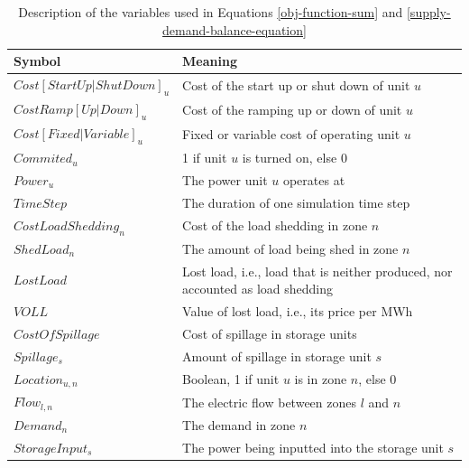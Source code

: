 \begin{table}
    \centering
    \begin{tabular}{|p{}|p{}|}
        \hline
        Symbol & Meaning \\ \hline
        $Cost[StartUp|ShutDown]_u$ & Cost of the start up or shut down of unit $u$ \\
        $CostRamp[Up|Down]_u$ & Cost of the ramping up or down of unit $u$ \\
        $Cost[Fixed|Variable]_u$ & Fixed or variable cost of operating unit $u$ \\
        $Commited_u$ & 1 if unit $u$ is turned on, else 0 \\
        $Power_u$ & The power unit $u$ operates at \\
        $TimeStep$ & The duration of one simulation time step \\
        $CostLoadShedding_n$ & Cost of the load shedding in zone $n$ \\
        $ShedLoad_n$ & The amount of load being shed in zone $n$ \\
        $LostLoad$ & Lost load, i.e., load that is neither produced, nor accounted as load shedding \\
        $VOLL$ & Value of lost load, i.e., its price per MWh \\
        $CostOfSpillage$ & Cost of spillage in storage units \\
        $Spillage_s$ & Amount of spillage in storage unit $s$ \\ \hline
        $Location_{u,n}$ & Boolean, 1 if unit $u$ is in zone $n$, else 0 \\
        $Flow_{l,n}$ & The electric flow between zones $l$ and $n$ \\
        $Demand_n$ & The demand in zone $n$ \\
        $StorageInput_s$ & The power being inputted into the storage unit $s$ \\ \hline
    \end{tabular}
    \caption{Description of the variables used in Equations \ref{obj-function-sum} and \ref{supply-demand-balance-equation}}
    \label{tab:equations-nomenclature}
\end{table}

